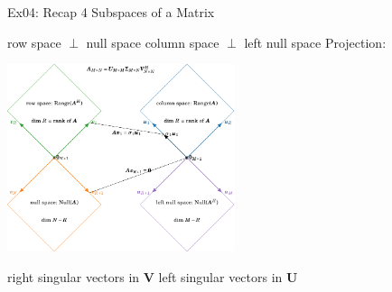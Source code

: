 \documentclass[mathserif, aspectratio=1610]{intbeamer}
\begin{document}


\begin{frame}[t]{Ex04: Recap 4 Subspaces of a Matrix}

\hspace{-0.5cm}
\textcolor{C2}{row space} $\perp$ \textcolor{C1}{null space}
\hspace{0.5cm}
\textcolor{C0}{column space} $\perp$ \textcolor{C4}{left null space}
\hspace{0.5cm}
Projection:

\begin{flushleft}
\includegraphics[width=0.5\textwidth]{four_subspaces.pdf}
\end{flushleft}

\hspace{-0.5cm}
right singular vectors in $\bm{V}$
\hspace{0.5cm}
left singular vectors in $\bm{U}$

\end{frame}
\end{document}
